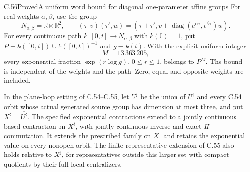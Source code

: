 \begin{claim}{C.56}{Proved}{A uniform word bound for diagonal one-parameter affine groups}
For real weights $\alpha,\beta$, use the group
\[
 N_{\alpha,\beta}=\mathbb R\ltimes\mathbb R^2,\qquad
 (\tau,v)(\tau',w)
 =(\tau+\tau',v+\operatorname{diag}(e^{\alpha\tau},
                                     e^{\beta\tau})w).
                                                        \tag{C.56.1}
\]
For every continuous path $k:[0,t]\to N_{\alpha,\beta}$
with $k(0)=1$, put $P=k([0,t])\cup k([0,t])^{-1}$ and
$g=k(t)$. With the explicit uniform integer
\[
                         M=13\,363\,205,                \tag{C.56.2}
\]
every exponential fraction $\exp(r\log g)$, $0\leq r\leq1$,
belongs to $P^M$. The bound is independent of the
weights and the path. Zero, equal and opposite
weights are included.

In the plane-loop setting of C.54--C.55, let $U^\sharp$
be the union of $U^\ddagger$ and every C.54 orbit whose
actual generated source group has dimension at most
three, and put $X^\sharp=\overline{U^\sharp}$.
The specified exponential contractions extend to a
jointly continuous based contraction on $X^\sharp$,
with jointly continuous inverse and exact
$H$-commutation. It extends the prescribed family on
$X^\ddagger$ and retains the exponential value on
every nonopen orbit.
The finite-representative extension of C.55 also
holds relative to $X^\sharp$, for representatives
outside this larger set with compact quotients
by their full local centralizers.
\end{claim}

